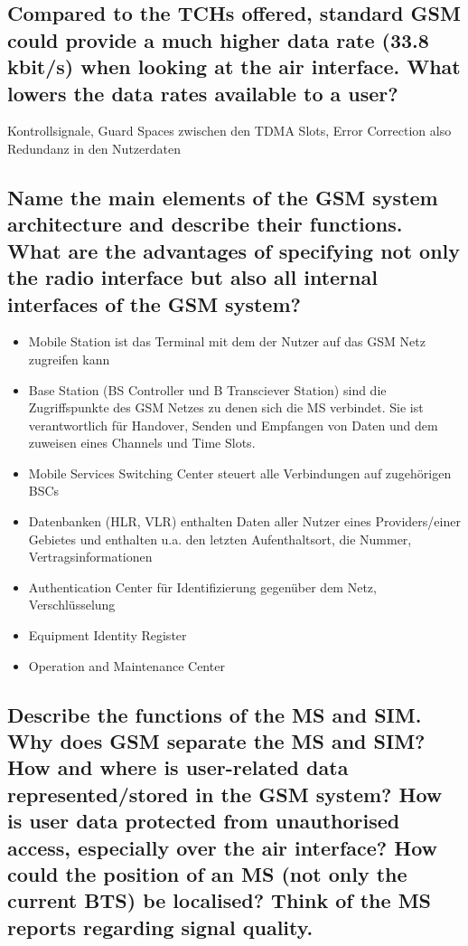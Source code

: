 \subsection{Compared to the TCHs offered, standard GSM could provide a much higher data rate
(33.8 kbit/s) when looking at the air interface. What lowers the data rates available to
a user?}
Kontrollsignale, Guard Spaces zwischen den TDMA Slots, Error Correction also Redundanz in den Nutzerdaten

\subsection{Name the main elements of the GSM system architecture and describe their
functions. What are the advantages of specifying not only the radio interface but also
all internal interfaces of the GSM system?}
\begin{itemize}
\item Mobile Station ist das Terminal mit dem der Nutzer auf das GSM Netz zugreifen kann

\item Base Station (BS Controller und B Transciever Station) sind die Zugriffspunkte des GSM Netzes zu denen sich die MS verbindet. Sie ist verantwortlich für Handover, Senden und Empfangen von Daten und dem zuweisen eines Channels und Time Slots.

\item Mobile Services Switching Center steuert alle Verbindungen auf zugehörigen BSCs

\item Datenbanken (HLR, VLR) enthalten Daten aller Nutzer eines Providers/einer Gebietes und enthalten u.a. den letzten Aufenthaltsort, die Nummer, Vertragsinformationen

\item Authentication Center für Identifizierung gegenüber dem Netz, Verschlüsselung

\item Equipment Identity Register 

\item Operation and Maintenance Center 
\end{itemize}


\subsection{Describe the functions of the MS and SIM. Why does GSM separate the MS and
SIM? How and where is user-related data represented/stored in the GSM system?
How is user data protected from unauthorised access, especially over the air
interface? How could the position of an MS (not only the current BTS) be localised?
Think of the MS reports regarding signal quality.}



